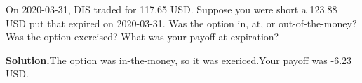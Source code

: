 \noindent On 2020-03-31, DIS traded for 117.65 USD. Suppose you were short a 123.88 USD put that expired on 2020-03-31. Was the option in, at, or out-of-the-money? Was the option exercised? What was your payoff at expiration?

\vspace{9pt} 

\textbf{Solution.}The option was in-the-money, so it was exericed.Your payoff was -6.23 USD.